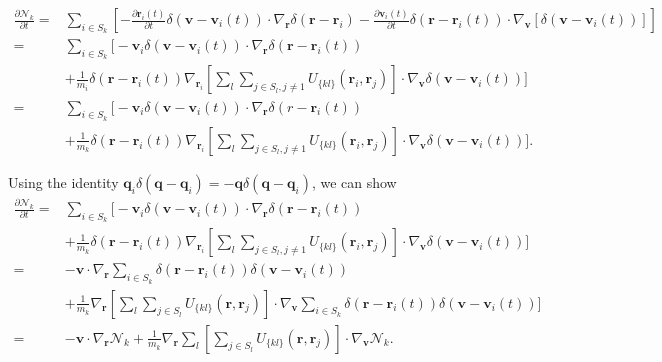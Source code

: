 \documentclass{article}
\begin{document}
\begin{align*}
\frac{\partial \mathcal{N}_k}{\partial t}=&\sum_{i\in S_k}\left[-\frac{\partial \mathbf{r}_i(t)}{\partial t}\delta(\mathbf{v}-\mathbf{v}_i(t))\cdot \nabla_\mathbf{r}\delta(\mathbf{r}-\mathbf{r}_i)-\frac{\partial \mathbf{v}_i(t)}{\partial t}\delta(\mathbf{r}-\mathbf{r}_i(t))\cdot \nabla_\mathbf{v}[\delta(\mathbf{v}-\mathbf{v}_i(t))]\right]\\
=&\sum_{i\in S_k}\bigg[-\mathbf{v}_i\delta(\mathbf{v}-\mathbf{v}_i(t))\cdot\nabla_\mathbf{r}\delta(\mathbf{r}-\mathbf{r}_i(t))\\&+\frac{1}{m_i}\delta(\mathbf{r}-\mathbf{r}_i(t))\nabla_{\mathbf{r}_i}\left[\sum_l\sum_{j\in S_l,j\neq 1}U_{\{kl\}}(\mathbf{r}_{i},\mathbf{r}_{j})\right]\cdot \nabla_\mathbf{v}\delta(\mathbf{v}-\mathbf{v}_i(t))\bigg]\\
=&\sum_{i\in S_k}\bigg[-\mathbf{v}_i\delta(\mathbf{v}-\mathbf{v}_i(t))\cdot\nabla_\mathbf{r}\delta(r-\mathbf{r}_i(t))\\&+\frac{1}{m_k}\delta(\mathbf{r}-\mathbf{r}_i(t))\nabla_{\mathbf{r}_{i}}\left[\sum_l\sum_{j\in S_l,j\neq 1}U_{\{kl\}}(\mathbf{r}_{i},\mathbf{r}_{j})\right]\cdot \nabla_\mathbf{v}\delta(\mathbf{v}-\mathbf{v}_i(t))\bigg].
\end{align*}

Using the identity $\mathbf{q}_i\delta(\mathbf{q}-\mathbf{q}_i)=-\mathbf{q}\delta(\mathbf{q}-\mathbf{q}_i)$, we can show
\begin{align*}
\frac{\partial \mathcal{N}_k}{\partial t}=&\sum_{i\in S_k}\bigg[-\mathbf{v}_i\delta(\mathbf{v}-\mathbf{v}_i(t))\cdot\nabla_\mathbf{r}\delta(\mathbf{r}-\mathbf{r}_i(t))\\&+\frac{1}{m_k}\delta(\mathbf{r}-\mathbf{r}_i(t))\nabla_{\mathbf{r}_{i}}\left[\sum_l\sum_{j\in S_l,j\neq 1}U_{\{kl\}}(\mathbf{r}_{i},\mathbf{r}_{j})\right]\cdot \nabla_\mathbf{v}\delta(\mathbf{v}-\mathbf{v}_i(t))\bigg]\\
=&-\mathbf{v}\cdot\nabla_\mathbf{r}\sum_{i\in S_k}\delta(\mathbf{r}-\mathbf{r}_i(t))\delta(\mathbf{v}-\mathbf{v}_i(t))\\&+\frac{1}{m_k}\nabla_{\mathbf{r}}\left[\sum_l\sum_{j\in S_l}U_{\{kl\}}(\mathbf{r},\mathbf{r}_{j})\right]\cdot \nabla_\mathbf{v}\sum_{i\in S_k}\delta(\mathbf{r}-\mathbf{r}_i(t))\delta(\mathbf{v}-\mathbf{v}_i(t))\bigg]\\
=&-\mathbf{v}\cdot \nabla_\mathbf{r}\mathcal{N}_k+\frac{1}{m_k}\nabla_\mathbf{r}\sum_l\left[\sum_{j\in S_l}U_{\{kl\}}(\mathbf{r},\mathbf{r}_j)\right]\cdot \nabla_\mathbf{v} \mathcal{N}_k.
\end{align*}
\end{document}
